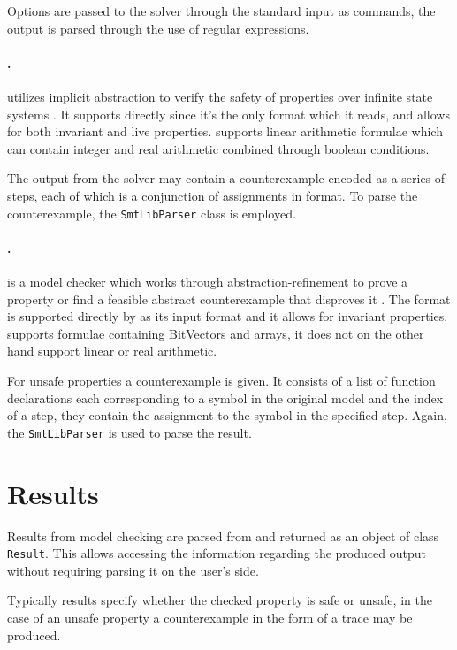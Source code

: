 Options are passed to the solver through the standard input as commands, the output is parsed through the use of regular expressions.

\paragraph*{\iceia{}.}
\iceia{} utilizes implicit abstraction to verify the safety of properties over infinite state systems \cite{10.1007/978-3-319-41528-4_15}.
It supports \vmtlib{} directly since it's the only format which it reads, and allows for both invariant and live properties.
\iceia{} supports linear arithmetic formulae which can contain integer and real arithmetic combined through boolean conditions.

The output from the solver may contain a counterexample encoded as a series of steps, each of which is a conjunction of assignments in \smtlib{} format. To parse the counterexample, the \texttt{SmtLibParser} class is employed.

\paragraph*{\euforia{}.}
\euforia{} is a model checker which works through abstraction-refinement to prove a property or find a feasible abstract counterexample that disproves it \cite{10.1007/978-3-030-11245-5_17}.
The \vmtlib{} format is supported directly by \euforia{} as its input format and it allows for invariant properties.
\euforia{} supports formulae containing BitVectors and arrays, it does not on the other hand support linear or real arithmetic.

For unsafe properties a counterexample is given. It consists of a list of function declarations each corresponding to a symbol in the original model and the index of a step, they contain the assignment to the symbol in the specified step. Again, the \texttt{SmtLibParser} is used to parse the result.


\section{Results}
Results from model checking are parsed from \pyvmt{} and returned as an object of class \texttt{Result}.
This allows accessing the information regarding the produced output without requiring parsing it on the user's side.

Typically results specify whether the checked property is safe or unsafe, in the case of an unsafe property a counterexample in the form of a trace may be produced.

